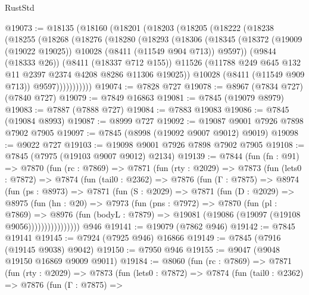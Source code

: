\begin{lexlean}{RustStd}
\begin{coremodule}
@19073 := @18135
    (@18160
      (@18201
        (@18203
          (@18205
            (@18222
              (@18238
                (@18255
                  (@18268
                    (@18276
                      (@18280
                        (@18293
                          (@18306
                            (@18345
                              (@18372
                                (@19009 (@19022 @19025))
                                @10028
                                (@8411 (@11549 @904 @713))
                                @9597))
                            (@9844 (@18333 @26))
                            (@8411 (@18337 @712 @155))
                            @11526
                            (@11788 @249 @645 @132 @11 @2397 @2374 @4208 @8286 @11306 @19025))
                          @10028
                          (@8411 (@11549 @909 @713))
                          @9597)))))))))))
@19074 := @7828 @727
@19078 := @8967 (@7834 @727) (@7840 @727)
@19079 := @7849 @16863
@19081 := @7845 (@19079 @8979)
@19083 := @7887 (@7888 @727)
@19084 := @7883 @19083
@19086 := @7845 (@19084 @8993)
@19087 := @8999 @727
@19092 := @19087 @9001 @7926 @7898 @7902 @7905
@19097 := @7845 (@8998 (@19092 @9007 @9012) @9019)
@19098 := @9022 @727
@19103 := @19098 @9001 @7926 @7898 @7902 @7905
@19108 := @7845 (@7975 (@19103 @9007 @9012) @2134)
@19139 := @7844
    (fun (fn : @91) =>
    @7870
      (fun (rc : @7869) =>
      @7871
        (fun (rty : @2029) =>
        @7873
          (fun (lets0 : @7872) =>
          @7874
            (fun (tail0 : @2362) =>
            @7876
              (fun (Γ : @7875) =>
              @8974
                (fun (ps : @8973) =>
                @7871
                  (fun (S : @2029) =>
                  @7871
                    (fun (D : @2029) =>
                    @8975
                      (fun (hn : @20) =>
                      @7973
                        (fun (pns : @7972) =>
                        @7870
                          (fun (pl : @7869) =>
                          @8976
                            (fun (bodyL : @7879) =>
                            @19081 (@19086 (@19097 (@19108 @9056))))))))))))))))
    @946
@19141 := @19079 (@7862 @946)
@19142 := @7845 @19141
@19145 := @7924 (@7925 @946) @16866
@19149 := @7845 (@7916 (@19145 @9038) @9042)
@19150 := @7950 @946
@19155 := @9047 (@9048 @19150 @16869 @9009 @9011)
@19184 := @8060
    (fun (rc : @7869) =>
    @7871
      (fun (rty : @2029) =>
      @7873
        (fun (lets0 : @7872) =>
        @7874
          (fun (tail0 : @2362) =>
          @7876
            (fun (Γ : @7875) =>

\end{coremodule}
\end{lexlean}
